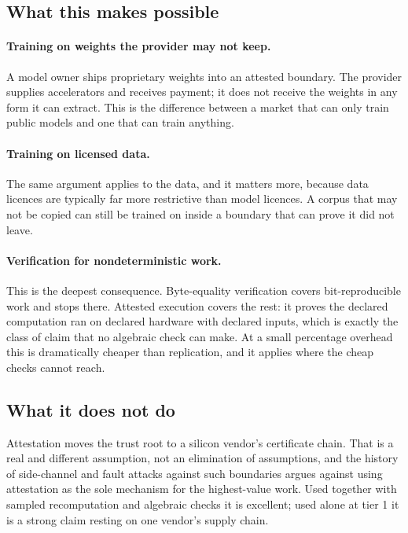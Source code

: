 \documentclass[11pt,a4paper]{article}
\begin{document}
\subsection{What this makes possible}

\paragraph{Training on weights the provider may not keep.} A model owner ships
proprietary weights into an attested boundary. The provider supplies
accelerators and receives payment; it does not receive the weights in any form it
can extract. This is the difference between a market that can only train public
models and one that can train anything.

\paragraph{Training on licensed data.} The same argument applies to the data,
and it matters more, because data licences are typically far more restrictive
than model licences. A corpus that may not be copied can still be trained on
inside a boundary that can prove it did not leave.

\paragraph{Verification for nondeterministic work.} This is the deepest
consequence. Byte-equality verification covers bit-reproducible work and stops
there. Attested execution covers the rest: it proves the declared computation ran
on declared hardware with declared inputs, which is exactly the class of claim
that no algebraic check can make. At a small percentage overhead this is
dramatically cheaper than replication, and it applies where the cheap checks
cannot reach.

\subsection{What it does not do}

Attestation moves the trust root to a silicon vendor's certificate chain. That is
a real and different assumption, not an elimination of assumptions, and the
history of side-channel and fault attacks against such boundaries argues against
using attestation as the sole mechanism for the highest-value work. Used together
with sampled recomputation and algebraic checks it is excellent; used alone at
tier 1 it is a strong claim resting on one vendor's supply chain.
\end{document}
